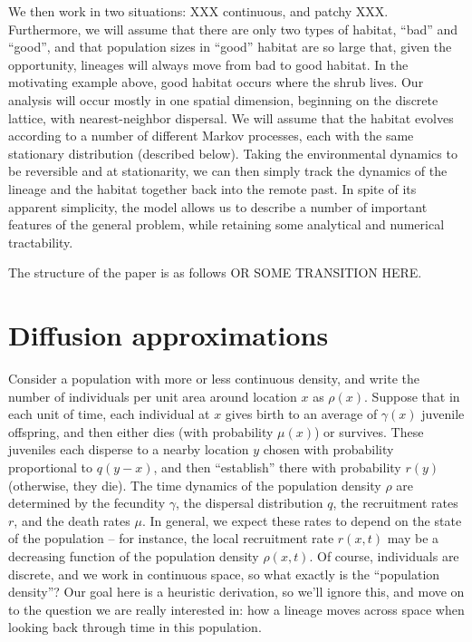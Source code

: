 \documentclass{article}
\begin{document}
We then work in two situations: XXX continuous, and patchy XXX.
Furthermore, we will assume that there are only two types of habitat, ``bad'' and ``good'',
and that population sizes in ``good'' habitat are so large that, given the opportunity,
lineages will always move from bad to good habitat.
In the motivating example above, good habitat occurs where the shrub lives.
Our analysis will occur mostly in one spatial dimension,
beginning on the discrete lattice, with nearest-neighbor dispersal.
We will assume that the habitat evolves according to a number of different Markov processes,
each with the same stationary distribution (described below).
Taking the environmental dynamics to be reversible and at stationarity,
we can then simply track the dynamics of the lineage and the habitat together
back into the remote past.
In spite of its apparent simplicity,
the model allows us to describe a number of important features of the general problem,
while retaining some analytical and numerical tractability.


The structure of the paper is as follows OR SOME TRANSITION HERE.


\section{Diffusion approximations}

Consider a population with more or less continuous density,
and write the number of individuals per unit area around location $x$ as $\rho(x)$.
Suppose that in each unit of time, each individual at $x$ 
gives birth to an average of $\gamma(x)$ juvenile offspring,
and then either dies (with probability $\mu(x)$) or survives.
These juveniles each disperse to a nearby location $y$
chosen with probability proportional to $q(y-x)$,
and then ``establish'' there with probability $r(y)$ (otherwise, they die).
The time dynamics of the population density $\rho$
are determined by the fecundity $\gamma$, the dispersal distribution $q$,
the recruitment rates $r$, and the death rates $\mu$.
In general, we expect these rates to depend on the state of the population
-- for instance, the local recruitment rate $r(x, t)$ may be a decreasing function
of the population density $\rho(x, t)$.
Of course, individuals are discrete, and we work in continuous space,
so what exactly is the ``population density''?
Our goal here is a heuristic derivation, so we'll ignore this,
and move on to the question we are really interested in:
how a lineage moves across space when looking back through time in this population.
\end{document}
